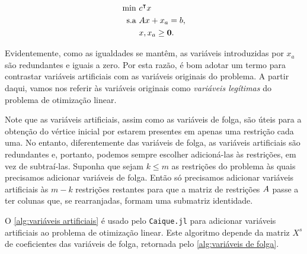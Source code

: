 \begin{align}
    \min\ &c^\intercal x\\
    \textrm{s.a }& A x + x_{a} = b,\\
    &  x, x_{a} \geq \vb 0.
\end{align}

Evidentemente, como as igualdades se mantêm, as variáveis introduzidas por $x_{a}$ são redundantes e iguais a zero. Por esta razão, é bom adotar um termo para contrastar variáveis artificiais com as variáveis originais do problema. A partir daqui, vamos nos referir às variáveis originais como \emph{variáveis legítimas} do problema de otimização linear.

Note que as variáveis artificiais, assim como as variáveis de folga, são úteis para a obtenção do vértice inicial por estarem presentes em apenas uma restrição cada uma. No entanto, diferentemente das variáveis de folga, as variáveis artificiais são redundantes e, portanto, podemos sempre escolher adicioná-las às restrições, em vez de subtraí-las. Suponha que sejam $k \leq m$ as restrições do problema às quais precisamos adicionar variáveis de folga. Então só precisamos adicionar variáveis artificiais às $m - k$ restrições restantes para que a matriz de restrições $A$ passe a ter colunas que, se rearranjadas, formam uma submatriz identidade.

O \cref{alg:variáveis artificiais} é usado pelo \texttt{Caique.jl} para adicionar variáveis artificiais ao problema de otimização linear. Este algoritmo depende da matriz $ X^s$ de coeficientes das variáveis de folga, retornada pelo \cref{alg:variáveis de folga}.

